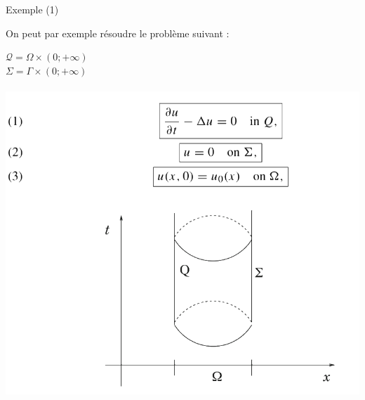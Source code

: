 \documentclass[10pt]{beamer}
\begin{document}
\begin{frame}{Exemple (1)}

On peut par exemple résoudre le problème suivant :

$\mathcal{Q}=\Omega \times (0;+\infty)$ \\
$\Sigma = \Gamma \times (0;+\infty)$ \\~\\


\includegraphics[scale=0.2]{exemple1.png}

\end{frame}
\end{document}
